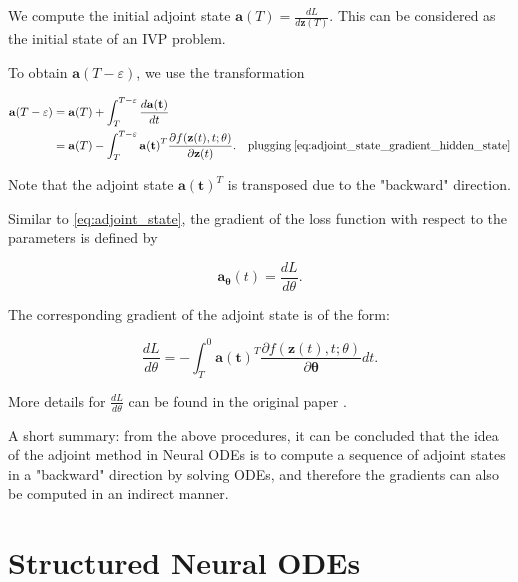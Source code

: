 \documentclass[
	parskip, 			   %
	twoside, 			   %
	DIV=14, 			   %
	BCOR=15.0mm, 		   %
	headsepline, 		   %
	open=right, 		   %
	captions=tableheading, %
	bibliography=totoc,    %
	numbers=noenddot       %
]{scrreprt}
\begin{document}
We compute the initial adjoint state $\mathbf{a}(T) = \frac{d L}{d\mathbf{z}(T)}$. This can be considered as the initial state of an IVP problem. 

To obtain $\mathbf{a}(T-\varepsilon)$, we use the transformation

\begin{equation}
    \label{eq:adjoint_state_ODE}
    \begin{aligned}
    \mathbf{a}(T-\varepsilon) &= \mathbf{a}(T) + \int_{T}^{T-\varepsilon} \frac{d\mathbf{a(t)}}{dt} \\
    &= \mathbf{a}(T) - \int_{T}^{T-\varepsilon} \mathbf{a(t)}^T \frac{\partial f(\mathbf{z}(t), t; \theta)}{\partial \mathbf{z}(t)}. \quad \text{plugging} \: \ref{eq:adjoint_state_gradient_hidden_state} \\ 
    \end{aligned}
\end{equation}

Note that the adjoint state $\mathbf{a(t)}^T$ is transposed due to the "backward" direction.

Similar to \ref{eq:adjoint_state}, the gradient of the loss function with respect to the parameters is defined by

\begin{equation}
    \label{eq:adjoint_state_parameters}
    \mathbf{a_\theta}(t) = \frac{d L}{d\theta}.
\end{equation}

The corresponding gradient of the adjoint state is of the form:

\begin{equation}
    \label{eq:adjoint_state_gradient_parameters}
    \frac{d L}{d\theta} = - \int_{T}^{0} \mathbf{a(t)}^T \frac{\partial f(\mathbf{z}(t), t; \theta)}{\partial \mathbf{\theta}} dt .
\end{equation}


More details for $\frac{d L}{d\theta}$ can be found in the original paper \cite{chen2018neural}.

A short summary: from the above procedures, it can be concluded that the idea of the adjoint method in Neural ODEs is to compute a sequence of adjoint states in a "backward" direction by solving ODEs, and therefore the gradients can also be computed in an indirect manner.


\clearpage
\chapter{Structured Neural ODEs}
\label{ch:chapter6}
\end{document}
